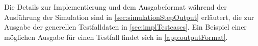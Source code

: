 Die Details zur Implementierung und dem Ausgabeformat während der Ausführung der Simulation sind in \autoref{sec:simulationStepOutput} erläutert, die zur Ausgabe der generellen Testfalldaten in \autoref{sec:implTestcases}. Ein Beispiel einer möglichen Ausgabe für einen Testfall findet sich in \autoref{app:outputFormat}.
